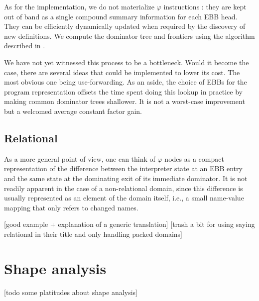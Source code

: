 \documentclass[11pt]{article}
\renewcommand{\phi}{\varphi}
\begin{document}
As for the implementation, we do not materialize $\phi$ instructions : they are kept out of band as a single compound summary information for each EBB head.
They can be efficiently dynamically updated when required by the discovery of new definitions.
We compute the dominator tree and frontiers using the algorithm described in \cite{domtree}.

We have not yet witnessed this process to be a bottleneck. Would it become the case, there are several ideas that could be implemented to lower its cost. The most obvious one being use-forwarding.
As an aside, the choice of EBBs for the program representation offsets the time spent doing this lookup in practice by making common dominator trees shallower.
It is not a worst-case improvement but a welcomed average constant factor gain.


\subsection*{Relational}

As a more general point of view, one can think of $\phi$ nodes as a compact representation of the difference between the interpreter state at an EBB entry and the same state at the dominating exit of its immediate dominator.
It is not readily apparent in the case of a non-relational domain, since this difference is usually represented as an element of the domain itself, i.e., a small name-value mapping that only refers to changed names.

[good example + explanation of a generic translation]
[trash a bit \cite{sparse-nr} for using saying relational in their title and only handling packed domains]

\section*{Shape analysis}

[todo some platitudes about shape analysis]
\end{document}
